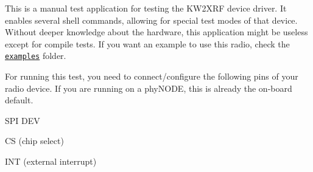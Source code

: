 This is a manual test application for testing the K\+W2\+X\+RF device driver. It enables several shell commands, allowing for special test modes of that device. Without deeper knowledge about the hardware, this application might be useless except for compile tests. If you want an example to use this radio, check the \href{../../examples}{\tt examples} folder.

For running this test, you need to connect/configure the following pins of your radio device. If you are running on a phy\+N\+O\+DE, this is already the on-\/board default.


\begin{DoxyItemize}
\item S\+PI D\+EV
\item CS (chip select)
\item I\+NT (external interrupt) 
\end{DoxyItemize}